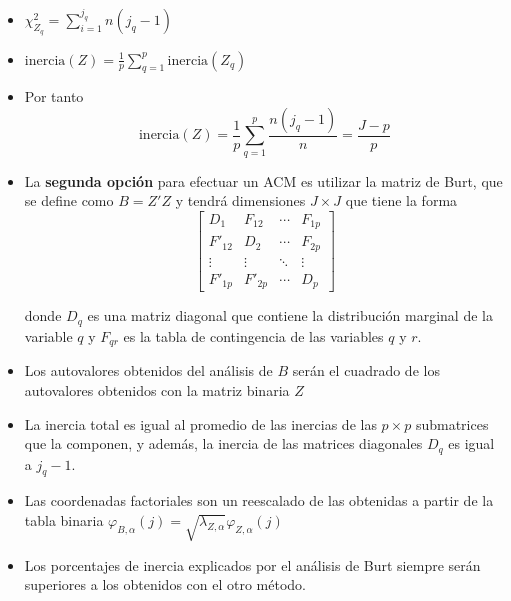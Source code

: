 \begin{itemize}
    \item $\chi^2_{Z_q}=\sum_{i=1}^{j_q}n(j_q-1)$
    \item $\text{inercia}(Z)=\frac{1}{p}\sum_{q=1}^p\text{inercia}(Z_q)$
    \item Por tanto
    \[
        \text{inercia}(Z)=\frac{1}{p}\sum_{q=1}^p\frac{n(j_q-1)}{n}=\frac{J-p}{p}
    \]
    \newpage
    \item La \textbf{segunda opción} para efectuar un ACM es utilizar la matriz de Burt, que se define como $B=Z'Z$ y tendrá dimensiones $J\times J$ que tiene la forma
    \[
        \begin{bmatrix}
            D_1     & F_{12}  & \cdots & F_{1p} \\
            F'_{12} & D_2     & \cdots & F_{2p} \\
            \vdots  & \vdots  & \ddots & \vdots \\
            F'_{1p} & F'_{2p} & \cdots & D_p
        \end{bmatrix}
    \]

    donde $D_q$ es una matriz diagonal que contiene la distribución marginal de la variable $q$ y $F_{qr}$ es la tabla de contingencia de las variables $q$ y $r$.
    \item Los autovalores obtenidos del análisis de $B$ serán el cuadrado de los autovalores obtenidos con la matriz binaria $Z$
    \item La inercia total es igual al promedio de las inercias de las $p\times p$ submatrices que la componen, y además, la inercia de las matrices diagonales $D_q$ es igual a $j_q-1$.
    \item Las coordenadas factoriales son un reescalado de las obtenidas a partir de la tabla binaria $\varphi_{B,\alpha}(j)=\sqrt{\lambda_{Z,\alpha}}\varphi_{Z,\alpha}(j)$
    \item Los porcentajes de inercia explicados por el análisis de Burt siempre serán superiores a los obtenidos con el otro método.
    \begin{table}[h!]
        \centering
        \resizebox{\textwidth}{!}{
    
}
\end{table}
\end{itemize}
